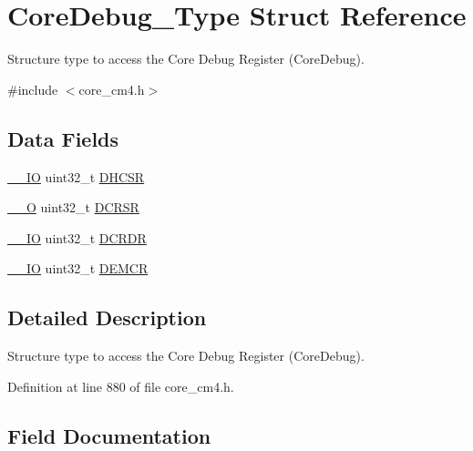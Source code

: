\hypertarget{struct_core_debug___type}{}\section{Core\+Debug\+\_\+\+Type Struct Reference}
\label{struct_core_debug___type}


Structure type to access the Core Debug Register (Core\+Debug).  




{\ttfamily \#include $<$core\+\_\+cm4.\+h$>$}

\subsection*{Data Fields}
\begin{DoxyCompactItemize}
\item 
\hyperlink{group___c_m_s_i_s__core__definitions_gaec43007d9998a0a0e01faede4133d6be}{\+\_\+\+\_\+\+IO} uint32\+\_\+t \hyperlink{struct_core_debug___type_a39bc5e68dc6071187fbe2348891eabfa}{D\+H\+C\+SR}
\item 
\hyperlink{group___c_m_s_i_s__core__definitions_ga7e25d9380f9ef903923964322e71f2f6}{\+\_\+\+\_\+O} uint32\+\_\+t \hyperlink{struct_core_debug___type_a7b49cb58573da77cc8a83a1b21262180}{D\+C\+R\+SR}
\item 
\hyperlink{group___c_m_s_i_s__core__definitions_gaec43007d9998a0a0e01faede4133d6be}{\+\_\+\+\_\+\+IO} uint32\+\_\+t \hyperlink{struct_core_debug___type_a5bcffe99d1d5471d5e5befbc6272ebf0}{D\+C\+R\+DR}
\item 
\hyperlink{group___c_m_s_i_s__core__definitions_gaec43007d9998a0a0e01faede4133d6be}{\+\_\+\+\_\+\+IO} uint32\+\_\+t \hyperlink{struct_core_debug___type_a6cdfc0a6ce3e988cc02c2d6e8107d193}{D\+E\+M\+CR}
\end{DoxyCompactItemize}


\subsection{Detailed Description}
Structure type to access the Core Debug Register (Core\+Debug). 

Definition at line 880 of file core\+\_\+cm4.\+h.



\subsection{Field Documentation}
\mbox{\label{struct_core_debug___type_a5bcffe99d1d5471d5e5befbc6272ebf0}} 
